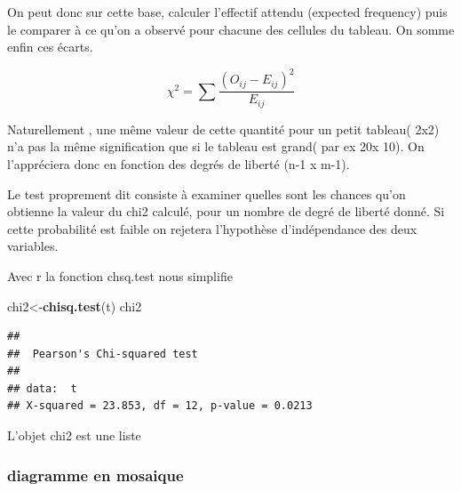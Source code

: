 \documentclass[
]{book}
\newenvironment{Shaded}{\begin{snugshade}}{\end{snugshade}}
\newcommand{\CommentTok}[1]{\textcolor[rgb]{0.56,0.35,0.01}{\textit{#1}}}
\newcommand{\DataTypeTok}[1]{\textcolor[rgb]{0.13,0.29,0.53}{#1}}
\newcommand{\DecValTok}[1]{\textcolor[rgb]{0.00,0.00,0.81}{#1}}
\newcommand{\KeywordTok}[1]{\textcolor[rgb]{0.13,0.29,0.53}{\textbf{#1}}}
\newcommand{\NormalTok}[1]{#1}
\newcommand{\OperatorTok}[1]{\textcolor[rgb]{0.81,0.36,0.00}{\textbf{#1}}}
\begin{document}
On peut donc sur cette base, calculer l'effectif attendu (expected frequency) puis le comparer à ce qu'on a observé pour chacune des cellules du tableau. On somme enfin ces écarts.

\[\chi^2 = \sum \frac {(O_{ij} - E_{ij})^2}{E_{ij}}\]

Naturellement , une même valeur de cette quantité pour un petit tableau( 2x2) n'a pas la même signification que si le tableau est grand( par ex 20x 10). On l'appréciera donc en fonction des degrés de liberté (n-1 x m-1).

Le test proprement dit consiste à examiner quelles sont les chances qu'on obtienne la valeur du chi2 calculé, pour un nombre de degré de liberté donné. Si cette probabilité est faible on rejetera l'hypothèse d'indépendance des deux variables.

Avec r la fonction chsq.test nous simplifie

\begin{Shaded}
\begin{Highlighting}[]
\NormalTok{chi2<-}\KeywordTok{chisq.test}\NormalTok{(t)}
\NormalTok{chi2}
\end{Highlighting}
\end{Shaded}

\begin{verbatim}
## 
##  Pearson's Chi-squared test
## 
## data:  t
## X-squared = 23.853, df = 12, p-value = 0.0213
\end{verbatim}

L'objet chi2 est une liste

\begin{Shaded}
\end{Shaded}

\hypertarget{diagramme-en-mosaique}{%
\subsubsection{diagramme en mosaique}\label{diagramme-en-mosaique}}
\end{document}
